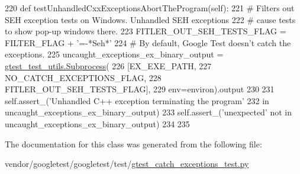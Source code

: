 \begin{DoxyCode}
220   \textcolor{keyword}{def }testUnhandledCxxExceptionsAbortTheProgram(self):
221     \textcolor{comment}{# Filters out SEH exception tests on Windows. Unhandled SEH exceptions}
222     \textcolor{comment}{# cause tests to show pop-up windows there.}
223     FITLER\_OUT\_SEH\_TESTS\_FLAG = FILTER\_FLAG + \textcolor{stringliteral}{'=-*Seh*'}
224     \textcolor{comment}{# By default, Google Test doesn't catch the exceptions.}
225     uncaught\_exceptions\_ex\_binary\_output = \hyperlink{classgtest__test__utils_1_1Subprocess}{gtest\_test\_utils.Subprocess}(
226         [EX\_EXE\_PATH,
227          NO\_CATCH\_EXCEPTIONS\_FLAG,
228          FITLER\_OUT\_SEH\_TESTS\_FLAG],
229         env=environ).output
230 
231     self.assert\_(\textcolor{stringliteral}{'Unhandled C++ exception terminating the program'}
232                  \textcolor{keywordflow}{in} uncaught\_exceptions\_ex\_binary\_output)
233     self.assert\_(\textcolor{stringliteral}{'unexpected'} \textcolor{keywordflow}{not} \textcolor{keywordflow}{in} uncaught\_exceptions\_ex\_binary\_output)
234 
235 
\end{DoxyCode}


The documentation for this class was generated from the following file\+:\begin{DoxyCompactItemize}
\item 
vendor/googletest/googletest/test/\hyperlink{gtest__catch__exceptions__test_8py}{gtest\+\_\+catch\+\_\+exceptions\+\_\+test.\+py}\end{DoxyCompactItemize}
